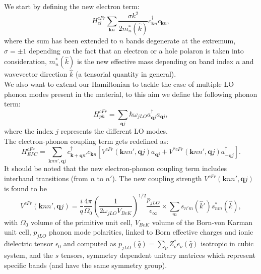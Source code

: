 \documentclass[12pt, a4paper]{report}
\numberwithin{equation}{section}
\begin{document}
We start by defining the new electron term:
\begin{equation}
    H^{cFr}_{el}\sum_{\mathbf{k}n}\frac{\sigma k^2}{2m^*_n(\hat{k})}c^\dagger_{\mathbf{k}n}c_{\mathbf{k}n},
    \label{cubic_froehlich_electron}
\end{equation}
where the sum has been extended to $n$ bands degenerate at the extremum, $\sigma=\pm 1$ depending on the fact that an electron or a hole 
polaron is taken into consideration, $m_n^*(\hat{k})$ is the new effective mass depending on band index $n$ and wavevector direction 
$\hat{k}$ (a tensorial quantity in general).\\
We also want to extend our Hamiltonian to tackle the case of multiple LO phonon modes present in the material, to this aim we define the 
following phonon term:
\begin{equation}
    H^{cFr}_{ph}=\sum_{\mathbf{q}j}\hbar\omega_{jLO}a^\dagger_{\mathbf{q}j}a_{\mathbf{q}j},
    \label{cubic_froehlich_phonon}
\end{equation}
where the index $j$ represents the different LO modes.\\
The electron-phonon coupling term gets redefined as:
\begin{equation}
    H^{cFr}_{EPC}=\sum_{\mathbf{k}nn',\mathbf{q}j}c^\dagger_{\mathbf{k}+\mathbf{q}n'}c_{\mathbf{k}n}\left[V^{cFr}(\mathbf{k}nn',\mathbf{q}j)a_{\mathbf{q}j}+V^{*cFr}(\mathbf{k}nn',\mathbf{q}j)a^\dagger_{-\mathbf{q}j}\right].
\end{equation}
It should be noted that the new electron-phonon coupling term includes interband transitions (from $n$ to $n'$). The new coupling strength 
$V^{cFr}(\mathbf{k}nn',\mathbf{q}j)$ is found to be
\begin{equation}
    V^{cFr}(\mathbf{k}nn',\mathbf{q}j)=\frac{i}{q}\frac{4\pi}{\Omega_0}\left(\frac{1}{2\omega_{jLO}V_{BvK}}\right)^{1/2}\frac{p_{jLO}}{\epsilon_\infty}\times \sum_{m}s_{n'm}(\hat{k}')s^*_{nm}(\hat{k}),
\end{equation}
with $\Omega_0$ volume of the primitive unit cell, $V_{BvK}$ volume of the Born-von Karman unit cell, $p_{jLO}$ phonon mode polarities, linked to Born 
effective charges and ionic dielectric tensor $\epsilon_0$ \cite{gonze1997dynamical} and computed as $p_{jLO}(\hat{q})=\sum_\nu Z^*_\nu e_\nu(\hat{q})$ isotropic in cubic 
system, and the $s$ tensors, symmetry dependent unitary matrices which represent specific bands (and have the same symmetry group).
\end{document}

